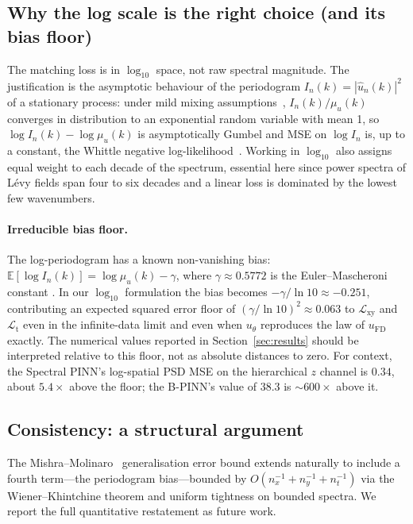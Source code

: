 \documentclass[review,12pt]{elsarticle}
\begin{document}
\subsection{Why the log scale is the right choice (and its bias floor)}

The matching loss is in \(\log_{10}\) space, not raw spectral
magnitude. The justification is the asymptotic behaviour of the
periodogram \(I_n(k) = |\widehat u_n(k)|^2\) of a stationary
process: under mild mixing
assumptions~\cite{Brillinger1981,Dahlhaus1996},
\(I_n(k) / \mu_u(k)\) converges in distribution to an exponential
random variable with mean 1, so \(\log I_n(k) - \log \mu_u(k)\)
is asymptotically Gumbel and MSE on \(\log I_n\) is, up to a
constant, the Whittle negative
log-likelihood~\cite{Whittle1953}. Working in \(\log_{10}\) also
assigns equal weight to each decade of the spectrum, essential
here since power spectra of L\'evy fields span four to six
decades and a linear loss is dominated by the lowest few
wavenumbers.

\paragraph{Irreducible bias floor.}
The log-periodogram has a known non-vanishing bias:
\(\mathbb E[\log I_n(k)] = \log \mu_u(k) - \gamma\),
where \(\gamma \approx 0.5772\) is the Euler--Mascheroni constant
\cite{Brillinger1981}. In our \(\log_{10}\) formulation the bias
becomes \(-\gamma/\ln 10 \approx -0.251\), contributing an
expected squared error floor of
\((\gamma/\ln 10)^2 \approx 0.063\) to
\(\mathcal L_{\mathrm{xy}}\) and \(\mathcal L_{\mathrm{t}}\) even
in the infinite-data limit and even when \(u_\theta\) reproduces
the law of \(u_{\mathrm{FD}}\) exactly. The numerical values
reported in Section~\ref{sec:results} should be interpreted
relative to this floor, not as absolute distances to zero. For
context, the Spectral PINN's log-spatial PSD MSE on the
hierarchical \(z\) channel is \(0.34\), about \(5.4\times\) above
the floor; the B-PINN's value of \(38.3\) is \(\sim 600\times\)
above it.

\subsection{Consistency: a structural argument}

The Mishra--Molinaro~\cite{MishraMolinaro2022} generalisation error bound extends naturally to include a fourth term---the periodogram bias---bounded by \(O(n_x^{-1}+n_y^{-1}+n_t^{-1})\) via the Wiener--Khintchine theorem and uniform tightness on bounded spectra. We report the full quantitative restatement as future work.
\end{document}
